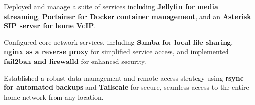 \documentclass[../main.tex]{subfiles}
\begin{document}
\vspace{0.10 cm}
\begin{onecolentry}
\begin{highlights}
    \item Deployed and manage a suite of services including \textbf{Jellyfin for media streaming}, \textbf{Portainer for Docker container management}, and an \textbf{Asterisk SIP server for home VoIP}.
    \item Configured core network services, including \textbf{Samba for local file sharing}, \textbf{nginx as a reverse proxy} for simplified service access, and implemented \textbf{fail2ban and firewalld} for enhanced security.
    \item Established a robust data management and remote access strategy using \textbf{rsync for automated backups} and \textbf{Tailscale} for secure, seamless access to the entire home network from any location.
\end{highlights}
\end{onecolentry}
\end{document}
